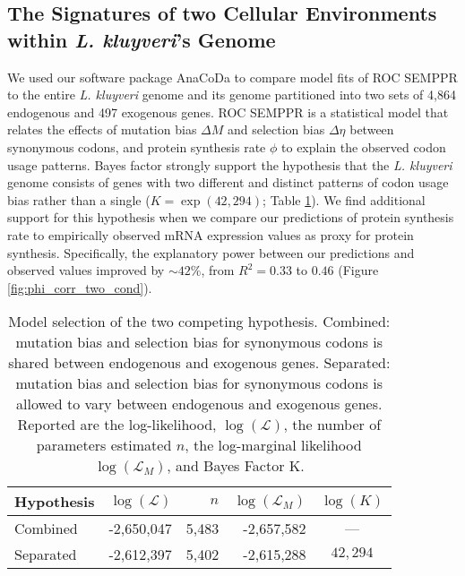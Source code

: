 \documentclass{bmcart}
\newcommand{\kluyveri}{\textit{L. kluyveri}\xspace}
\newcommand{\ROC}{ROC SEMPPR\xspace}
\newcommand{\DM}{\ensuremath{{\Delta M}}\xspace}
\newcommand{\DE}{\ensuremath{{\Delta \eta}}\xspace}
\newcommand{\Lik}{\ensuremath{\mathcal{L}}\xspace}
\begin{document}
\subsection*{The Signatures of two Cellular Environments within \kluyveri's Genome}
We used our software package AnaCoDa \citep{landerer2018} to compare model fits of \ROC to the entire \kluyveri genome and its genome partitioned into two sets of 4,864 endogenous and 497 exogenous genes.
\ROC is a statistical model that relates the effects of mutation bias \DM and selection bias \DE between synonymous codons, and protein synthesis rate $\phi$ to explain the observed codon usage patterns.
Bayes factor strongly support the hypothesis that the \kluyveri genome consists of genes with two different and distinct patterns of codon usage bias rather than a single ($K = \exp(42,294)$; Table \ref{tab:AIC_klu}).
We find additional support for this hypothesis when we compare our predictions of protein synthesis rate to empirically observed mRNA expression values as proxy for protein synthesis.
Specifically, the explanatory power between our predictions and observed values improved by $\sim 42\%$, from $R^2 = 0.33$ to $0.46$ (Figure \ref{fig:phi_corr_two_cond}).

\begin{table}
  \centering
  \caption{Model selection of the two competing hypothesis. 
  Combined: mutation bias and selection bias for synonymous codons is shared between endogenous and exogenous genes.
  Separated: mutation bias and selection bias for synonymous codons is allowed to vary between endogenous and exogenous genes.
  Reported are the log-likelihood, $\log(\Lik)$, the number of parameters estimated $n$, the log-marginal likelihood $\log(\Lik_M)$, and Bayes Factor K.}
  \begin{tabular}{lrrrc}
    \hline
    Hypothesis             & $\log(\Lik)$ &$n$ & $\log(\Lik_M)$ & $\log(K)$\\ \hline 
    Combined               & -2,650,047 & 5,483 & -2,657,582 & --- \\
    Separated		   & -2,612,397 & 5,402 & -2,615,288 & $42,294$\\ \hline
  \end{tabular}
  \label{tab:AIC_klu}
\end{table}
\end{document}
